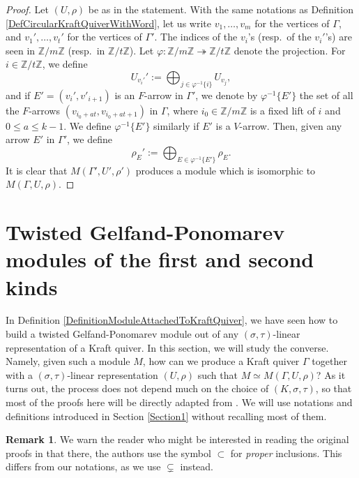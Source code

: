 \documentclass[12pt]{amsart}
\theoremstyle{definition}
\newtheorem{remark}[theorem]{Remark}
\newcommand{\<}{\langle}   %
\renewcommand{\>}{\rangle} %
\begin{document}
\begin{proof}
    Let $(U,\rho)$ be as in the statement. With the same notations as Definition \ref{DefCircularKraftQuiverWithWord}, let us write $v_1,\ldots , v_{m}$ for the vertices of $\Gamma$, and $v_1',\ldots ,v_t'$ for the vertices of $\Gamma'$. The indices of the $v_i$'s (resp.~of the $v_i'$'s) are seen in $\mathbb Z/m\mathbb Z$ (resp.~in $\mathbb Z/t\mathbb Z$). Let $\varphi:\mathbb Z/m\mathbb Z \twoheadrightarrow \mathbb Z/t\mathbb Z$ denote the projection. For $i \in \mathbb Z/t\mathbb Z$, we define 
    \begin{equation*}
        U_{v_i'}' := \bigoplus_{j \in \varphi^{-1}\{i\}} U_{v_j},
    \end{equation*}
    and if $E' = (v_{i}',v'_{i+1})$ is an $F$-arrow in $\Gamma'$, we denote by $\varphi^{-1}\{E'\}$ the set of all the $F$-arrows $(v_{i_0+at},v_{i_0+at+1})$ in $\Gamma$, where $i_0 \in \mathbb Z/m \mathbb Z$ is a fixed lift of $i$ and $0 \leq a \leq k-1$. We define $\varphi^{-1}\{E'\}$ similarly if $E'$ is a $V$-arrow. Then, given any arrow $E'$ in $\Gamma'$, we define
    \begin{equation*}
        \rho_E' := \bigoplus_{E \in \varphi^{-1}\{E'\}} \rho_E.
    \end{equation*}
    It is clear that $M(\Gamma',U',\rho')$ produces a module which is isomorphic to $M(\Gamma,U,\rho)$.
\end{proof}

\section{Twisted Gelfand-Ponomarev modules of the first and second kinds} \label{Section3}

In Definition \ref{DefinitionModuleAttachedToKraftQuiver}, we have seen how to build a twisted Gelfand-Ponomarev module out of any $(\sigma,\tau)$-linear representation of a Kraft quiver. In this section, we will study the converse. Namely, given such a module $M$, how can we produce a Kraft quiver $\Gamma$ together with a $(\sigma,\tau)$-linear representation $(U,\rho)$ such that $M \simeq M(\Gamma,U,\rho)$? As it turns out, the process does not depend much on the choice of $(K,\sigma,\tau)$, so that most of the proofs here will be directly adapted from \cite{gelfand-ponomarev:1968}. We will use notations and definitions introduced in Section \ref{Section1} without recalling most of them.

\begin{remark}
    We warn the reader who might be interested in reading the original proofs in \cite{gelfand-ponomarev:1968} that there, the authors use the symbol $\subset$ for \textit{proper} inclusions. This differs from our notations, as we use $\subsetneq$ instead. 
\end{remark}
\end{document}
